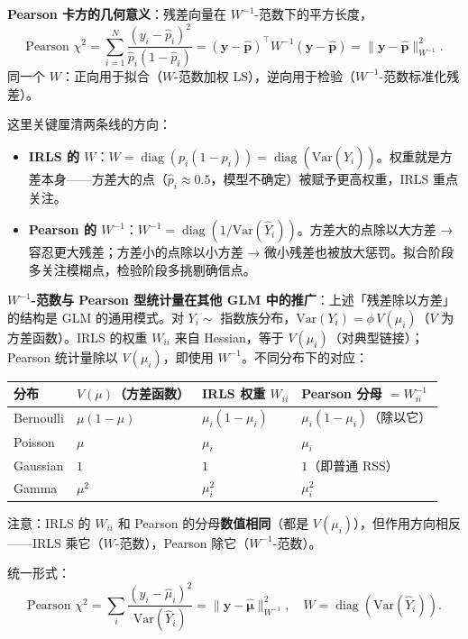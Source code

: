\textbf{Pearson 卡方的几何意义}：残差向量在 $W^{-1}$-范数下的平方长度，
\[
\boxed{\text{Pearson } \chi^2
    = \sum_{i=1}^{N} \frac{(y_i - \hat{p}_i)^2}{\hat{p}_i(1 - \hat{p}_i)}
    = (\mathbf{y} - \hat{\mathbf{p}})^\top W^{-1} (\mathbf{y} - \hat{\mathbf{p}})
    = \|\mathbf{y} - \hat{\mathbf{p}}\|_{W^{-1}}^2.}
\]
同一个 $W$：正向用于拟合（$W$-范数加权 LS），逆向用于检验（$W^{-1}$-范数标准化残差）。

这里关键厘清两条线的方向：
\begin{itemize}
    \item \textbf{IRLS 的 $W$}：$W = \operatorname{diag}(p_i(1-p_i)) = \operatorname{diag}(\mathrm{Var}(\hat{Y}_i))$。权重就是方差本身——方差大的点（$\hat{p}_i \approx 0.5$，模型不确定）被赋予更高权重，IRLS 重点关注。
    \item \textbf{Pearson 的 $W^{-1}$}：$W^{-1} = \operatorname{diag}(1/\mathrm{Var}(\hat{Y}_i))$。方差大的点除以大方差 → 容忍更大残差；方差小的点除以小方差 → 微小残差也被放大惩罚。拟合阶段多关注模糊点，检验阶段多挑剔确信点。
\end{itemize}

\textbf{$W^{-1}$-范数与 Pearson 型统计量在其他 GLM 中的推广}：上述「残差除以方差」的结构是 GLM 的通用模式。对 $Y_i \sim$ 指数族分布，$\mathrm{Var}(Y_i) = \phi \, V(\mu_i)$（$V$ 为方差函数）。IRLS 的权重 $W_{ii}$ 来自 Hessian，等于 $V(\mu_i)$（对典型链接）；Pearson 统计量除以 $V(\mu_i)$，即使用 $W^{-1}$。不同分布下的对应：

\begin{center}
\begin{tabular}{llll}
\toprule
分布 & $V(\mu)$（方差函数） & IRLS 权重 $W_{ii}$ & Pearson 分母 $= W^{-1}_{ii}$ \\
\midrule
Bernoulli & $\mu(1-\mu)$ & $\mu_i(1-\mu_i)$ & $\mu_i(1-\mu_i)$（除以它） \\
Poisson & $\mu$ & $\mu_i$ & $\mu_i$ \\
Gaussian & $1$ & $1$ & $1$（即普通 RSS） \\
Gamma & $\mu^2$ & $\mu_i^2$ & $\mu_i^2$ \\
\bottomrule
\end{tabular}
\end{center}

注意：IRLS 的 $W_{ii}$ 和 Pearson 的分母\textbf{数值相同}（都是 $V(\mu_i)$），但作用方向相反——IRLS 乘它（$W$-范数），Pearson 除它（$W^{-1}$-范数）。

统一形式：
\[
\boxed{\text{Pearson } \chi^2 = \sum_i \frac{(y_i - \hat{\mu}_i)^2}{\mathrm{Var}(\hat{Y}_i)}
    = \|\mathbf{y} - \hat{\boldsymbol{\mu}}\|_{W^{-1}}^2,
    \quad W = \operatorname{diag}\!\left(\mathrm{Var}(\hat{Y}_i)\right).}
\]

